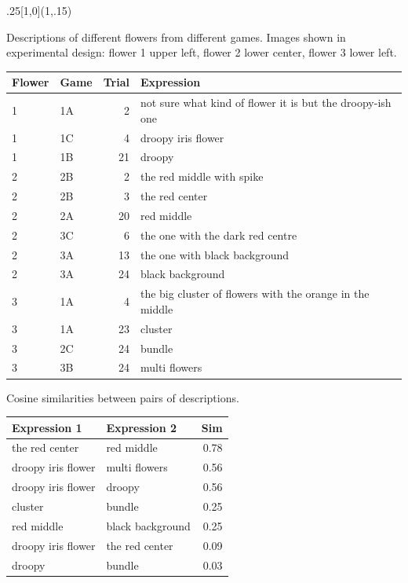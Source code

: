 \documentclass[10pt, xcolor=table, dvipsnames]{beamer}
\begin{document}
		\begin{textblock}{.25}[1,0](1,.15)
	\begin{tcolorbox}[title={\centering Examples}]
		\vspace{.2em}
		
		\centering
		\begin{footnotesize}
			Descriptions of different flowers from different games. Images shown in  experimental design: flower 1 upper left, flower 2 lower center, flower 3 lower left.
			\vspace{-1em}
			
			\centering
			\begin{tabular}[t]{llr>{\raggedright\arraybackslash}p{16em}}
				\toprule
				Flower & Game & Trial & Expression\\
				\midrule
				1 & 1A & 2 & not sure what kind of flower it is but the droopy-ish one\\
				1 & 1C & 4 & droopy iris flower\\
				1 & 1B & 21 & droopy\\
				\midrule
				2 & 2B & 2 & the red middle with spike\\
				2 & 2B & 3 & the red center\\
				2 & 2A & 20 & red middle\\
				2 & 3C & 6 & the one with the dark red centre\\
				2 & 3A & 13 & the one with black background\\
				2 & 3A & 24 & black background\\
				\midrule
				3 & 1A & 4 & the big cluster of flowers with the orange in the middle\\
				3 & 1A & 23 & cluster\\
				3 & 2C & 24 & bundle\\
				3 & 3B & 24 & multi flowers\\
				\bottomrule
			\end{tabular}
			
			\vspace{1em}
			Cosine similarities between pairs of descriptions. 
			
			\vspace{-1.5em}
			\begin{tabular}[t]{>{\raggedright\arraybackslash}p{9em}>{\raggedright\arraybackslash}p{9em}r}
				\toprule
				Expression 1 & Expression 2 & Sim\\
				\midrule
				the red center & red middle & 0.78\\
				droopy iris flower & multi flowers & 0.56\\
				droopy iris flower & droopy & 0.56\\
				cluster & bundle & 0.25\\
				red middle & black background & 0.25\\
				droopy iris flower & the red center & 0.09\\
				droopy & bundle & 0.03\\
				\bottomrule
			\end{tabular}
		\end{footnotesize}
		\vspace{.5em}
	\end{tcolorbox}
\end{textblock}
\end{document}
